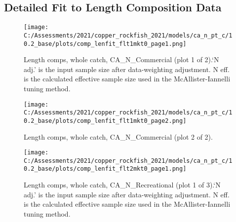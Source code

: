 \documentclass[11pt,
  english,
  a4paper,
]{article}
\begin{document}
\tagmcend\tagstructend

\newpage


\hypertarget{append-fit}{%
\subsection{Detailed Fit to Length Composition Data}\label{append-fit}}

\leavevmode\tagmcend\tagstructend


\begin{figure}
\centering
\texttt{[image: C:/Assessments/2021/copper\_rockfish\_2021/models/ca\_n\_pt\_c/10.2\_base/plots/comp\_lenfit\_flt1mkt0\_page1.png]}
\caption{Length comps, whole catch, CA\_N\_Commercial (plot 1 of 2).`N adj.' is the input sample size after data-weighting adjustment. N eff. is the calculated effective sample size used in the McAllister-Iannelli tuning method.\label{fig:comp_lenfit_flt1mkt0_page1}}
\end{figure}

\tagmcend\tagstructend


\begin{figure}
\centering
\texttt{[image: C:/Assessments/2021/copper\_rockfish\_2021/models/ca\_n\_pt\_c/10.2\_base/plots/comp\_lenfit\_flt1mkt0\_page2.png]}
\caption{Length comps, whole catch, CA\_N\_Commercial (plot 2 of 2).\label{fig:comp_lenfit_flt1mkt0_page2}}
\end{figure}

\tagmcend\tagstructend


\begin{figure}
\centering
\texttt{[image: C:/Assessments/2021/copper\_rockfish\_2021/models/ca\_n\_pt\_c/10.2\_base/plots/comp\_lenfit\_flt2mkt0\_page1.png]}
\caption{Length comps, whole catch, CA\_N\_Recreational (plot 1 of 3).`N adj.' is the input sample size after data-weighting adjustment. N eff. is the calculated effective sample size used in the McAllister-Iannelli tuning method.\label{fig:comp_lenfit_flt2mkt0_page1}}
\end{figure}
\end{document}
